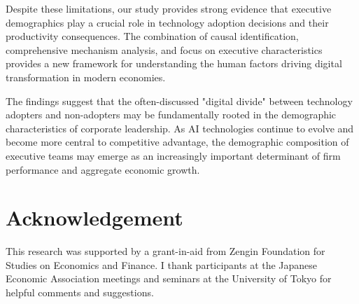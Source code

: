 \documentclass[12pt, a4paper]{article}
\begin{document}
Despite these limitations, our study provides strong evidence that executive demographics play a crucial role in technology adoption decisions and their productivity consequences. The combination of causal identification, comprehensive mechanism analysis, and focus on executive characteristics provides a new framework for understanding the human factors driving digital transformation in modern economies.

The findings suggest that the often-discussed "digital divide" between technology adopters and non-adopters may be fundamentally rooted in the demographic characteristics of corporate leadership. As AI technologies continue to evolve and become more central to competitive advantage, the demographic composition of executive teams may emerge as an increasingly important determinant of firm performance and aggregate economic growth.

\section*{Acknowledgement}
This research was supported by a grant-in-aid from Zengin Foundation for Studies on Economics and Finance. I thank participants at the Japanese Economic Association meetings and seminars at the University of Tokyo for helpful comments and suggestions.

\newpage
\end{document}
